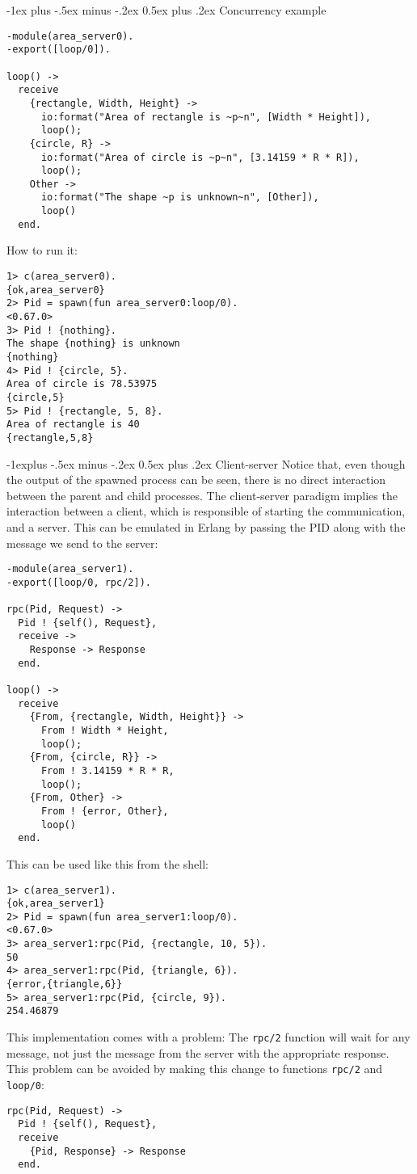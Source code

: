\documentclass[10pt,landscape]{article}
\makeatletter
\renewcommand{\section}{\@startsection{section}{1}{0mm}%
                                {-1ex plus -.5ex minus -.2ex}%
                                {0.5ex plus .2ex}%
                                {\normalfont\large\bfseries}}
\renewcommand{\subsection}{\@startsection{subsection}{2}{0mm}%
                                {-1explus -.5ex minus -.2ex}%
                                {0.5ex plus .2ex}%
                                {\normalfont\normalsize\bfseries}}
\makeatother
\begin{document}
\begin{multicols}{3}
\section{Concurrency example}
\begin{verbatim}
-module(area_server0).
-export([loop/0]).

loop() ->
  receive
    {rectangle, Width, Height} ->
      io:format("Area of rectangle is ~p~n", [Width * Height]),
      loop();
    {circle, R} ->
      io:format("Area of circle is ~p~n", [3.14159 * R * R]),
      loop();
    Other ->
      io:format("The shape ~p is unknown~n", [Other]),
      loop()
  end.
\end{verbatim}
How to run it:
\begin{verbatim}
1> c(area_server0).
{ok,area_server0}
2> Pid = spawn(fun area_server0:loop/0).
<0.67.0>
3> Pid ! {nothing}.
The shape {nothing} is unknown
{nothing}
4> Pid ! {circle, 5}.
Area of circle is 78.53975
{circle,5}
5> Pid ! {rectangle, 5, 8}.
Area of rectangle is 40
{rectangle,5,8}
\end{verbatim}
\subsection{Client-server}
Notice that, even though the output of the spawned process can be seen, there is no direct interaction between the parent and child processes. The client-server paradigm implies the interaction between a client, which is responsible of starting the communication, and a server. This can be emulated in Erlang by passing the PID along with the message we send to the server:
\begin{verbatim}
-module(area_server1).
-export([loop/0, rpc/2]).

rpc(Pid, Request) -> 
  Pid ! {self(), Request},
  receive ->
    Response -> Response
  end.

loop() ->
  receive
    {From, {rectangle, Width, Height}} ->
      From ! Width * Height,
      loop();
    {From, {circle, R}} ->
      From ! 3.14159 * R * R,
      loop();
    {From, Other} ->
      From ! {error, Other},
      loop()
  end.
\end{verbatim}
This can be used like this from the shell:
\begin{verbatim}
1> c(area_server1).
{ok,area_server1}
2> Pid = spawn(fun area_server1:loop/0).
<0.67.0>
3> area_server1:rpc(Pid, {rectangle, 10, 5}).
50
4> area_server1:rpc(Pid, {triangle, 6}).     
{error,{triangle,6}}
5> area_server1:rpc(Pid, {circle, 9}).  
254.46879
\end{verbatim}
This implementation comes with a problem: The \texttt{rpc/2} function will wait for any message, not just the message from the server with the appropriate response. This problem can be avoided by making this change to functions \texttt{rpc/2} and \texttt{loop/0}:
\begin{verbatim}
rpc(Pid, Request) ->
  Pid ! {self(), Request},
  receive
    {Pid, Response} -> Response
  end.
  

\end{verbatim}
\end{multicols}
\end{document}
